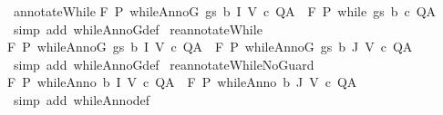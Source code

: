 \begin{isabellebody}
{\isafoldproof}%
%
\isadelimproof
\isanewline
%
\endisadelimproof
\isanewline
{}\isamarkupfalse%
\ annotateWhile{\isacharcolon}\isanewline
{\isachardoublequoteopen}{\isasymlbrakk}{\isasymGamma}{\isacharcomma}{\isasymTheta}{\isasymturnstile}\isactrlbsub {\isacharslash}F\isactrlesub \ P\ {\isacharparenleft}whileAnnoG\ gs\ b\ I\ V\ c{\isacharparenright}\ Q{\isacharcomma}A{\isasymrbrakk}\ {\isasymLongrightarrow}\ {\isasymGamma}{\isacharcomma}{\isasymTheta}{\isasymturnstile}\isactrlbsub {\isacharslash}F\isactrlesub \ P\ {\isacharparenleft}while\ gs\ b\ c{\isacharparenright}\ Q{\isacharcomma}A{\isachardoublequoteclose}\isanewline
%
\isadelimproof
\ \ %
\endisadelimproof
%
\isatagproof
{}\isamarkupfalse%
\ {\isacharparenleft}simp\ add{\isacharcolon}\ whileAnnoG{\isacharunderscore}def{\isacharparenright}%
\endisatagproof
{\isafoldproof}%
%
\isadelimproof
\isanewline
%
\endisadelimproof
\isanewline
\isanewline
{}\isamarkupfalse%
\ reannotateWhile{\isacharcolon}\isanewline
{\isachardoublequoteopen}{\isasymlbrakk}{\isasymGamma}{\isacharcomma}{\isasymTheta}{\isasymturnstile}\isactrlbsub {\isacharslash}F\isactrlesub \ P\ {\isacharparenleft}whileAnnoG\ gs\ b\ I\ V\ c{\isacharparenright}\ Q{\isacharcomma}A{\isasymrbrakk}\ {\isasymLongrightarrow}\ {\isasymGamma}{\isacharcomma}{\isasymTheta}{\isasymturnstile}\isactrlbsub {\isacharslash}F\isactrlesub \ P\ {\isacharparenleft}whileAnnoG\ gs\ b\ J\ V\ c{\isacharparenright}\ Q{\isacharcomma}A{\isachardoublequoteclose}\isanewline
%
\isadelimproof
\ \ %
\endisadelimproof
%
\isatagproof
{}\isamarkupfalse%
\ {\isacharparenleft}simp\ add{\isacharcolon}\ whileAnnoG{\isacharunderscore}def{\isacharparenright}%
\endisatagproof
{\isafoldproof}%
%
\isadelimproof
\isanewline
%
\endisadelimproof
\isanewline
{}\isamarkupfalse%
\ reannotateWhileNoGuard{\isacharcolon}\isanewline
{\isachardoublequoteopen}{\isasymlbrakk}{\isasymGamma}{\isacharcomma}{\isasymTheta}{\isasymturnstile}\isactrlbsub {\isacharslash}F\isactrlesub \ P\ {\isacharparenleft}whileAnno\ b\ I\ V\ c{\isacharparenright}\ Q{\isacharcomma}A{\isasymrbrakk}\ {\isasymLongrightarrow}\ {\isasymGamma}{\isacharcomma}{\isasymTheta}{\isasymturnstile}\isactrlbsub {\isacharslash}F\isactrlesub \ P\ {\isacharparenleft}whileAnno\ b\ J\ V\ c{\isacharparenright}\ Q{\isacharcomma}A{\isachardoublequoteclose}\isanewline
%
\isadelimproof
\ \ %
\endisadelimproof
%
\isatagproof
{}\isamarkupfalse%
\ {\isacharparenleft}simp\ add{\isacharcolon}\ whileAnno{\isacharunderscore}def{\isacharparenright}%
\endisatagproof
{\isafoldproof}%

\end{isabellebody}
